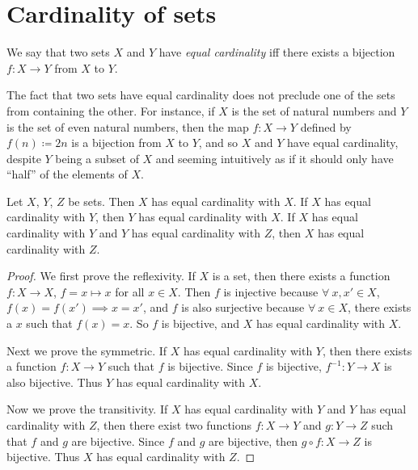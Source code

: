 \section{Cardinality of sets}\label{sec 3.6}

\begin{definition}\label{3.6.1}
We say that two sets \(X\) and \(Y\) have \emph{equal cardinality} iff there exists a bijection \(f : X \to Y\) from \(X\) to \(Y\).
\end{definition}

\setcounter{theorem}{2}
\begin{remark}\label{3.6.3}
The fact that two sets have equal cardinality does not preclude one of the sets from containing the other.
For instance, if \(X\) is the set of natural numbers and \(Y\) is the set of even natural numbers, then the map \(f : X \to Y\) defined by \(f(n) \coloneqq 2n\) is a bijection from \(X\) to \(Y\), and so \(X\) and \(Y\) have equal cardinality, despite \(Y\) being a subset of \(X\) and seeming intuitively as if it should only have ``half'' of the elements of \(X\).
\end{remark}

\begin{proposition}\label{3.6.4}
Let \(X\), \(Y\), \(Z\) be sets.
Then \(X\) has equal cardinality with \(X\).
If \(X\) has equal cardinality with \(Y\), then \(Y\) has equal cardinality with \(X\).
If \(X\) has equal cardinality with \(Y\) and \(Y\) has equal cardinality with \(Z\), then \(X\) has equal cardinality with \(Z\).
\end{proposition}

\begin{proof}
We first prove the reflexivity.
If \(X\) is a set, then there exists a function \(f : X \to X\), \(f = x \mapsto x\) for all \(x \in X\).
Then \(f\) is injective because \(\forall\ x, x' \in X\), \(f(x) = f(x') \implies x = x'\), and \(f\) is also surjective because \(\forall\ x \in X\), there exists a \(x\) such that \(f(x) = x\).
So \(f\) is bijective, and \(X\) has equal cardinality with \(X\).

Next we prove the symmetric.
If \(X\) has equal cardinality with \(Y\), then there exists a function \(f : X \to Y\) such that \(f\) is bijective.
Since \(f\) is bijective, \(f^{-1} : Y \to X\) is also bijective.
Thus \(Y\) has equal cardinality with \(X\).

Now we prove the transitivity.
If \(X\) has equal cardinality with \(Y\) and \(Y\) has equal cardinality with \(Z\), then there exist two functions \(f : X \to Y\) and \(g : Y \to Z\) such that \(f\) and \(g\) are bijective.
Since \(f\) and \(g\) are bijective, then \(g \circ f : X \to Z\) is bijective.
Thus \(X\) has equal cardinality with \(Z\).
\end{proof}

